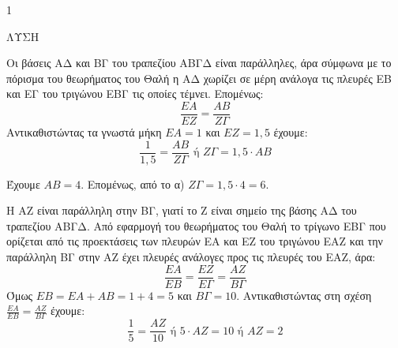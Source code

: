 \begin{ylh}{1}
    \item[Γεωμετρία Β' Λυκείου, Θεώρημα Θαλή]
\end{ylh}
ΛΥΣΗ

\begin{alist}
    \item Οι βάσεις ΑΔ και ΒΓ του τραπεζίου ΑΒΓΔ είναι παράλληλες, άρα σύμφωνα με το πόρισμα του θεωρήματος του Θαλή η ΑΔ χωρίζει σε μέρη ανάλογα τις πλευρές ΕΒ και ΕΓ του τριγώνου ΕΒΓ τις οποίες τέμνει. Επομένως:
    \[
        \frac{ΕΑ}{ΕΖ} = \frac{ΑΒ}{ΖΓ}
    \]
    Αντικαθιστώντας τα γνωστά μήκη $ΕΑ = 1$ και $ΕΖ = 1,5$ έχουμε:
    \[
        \frac{1}{1,5} = \frac{ΑΒ}{ΖΓ} \text{ ή } ΖΓ = 1,5 \cdot ΑΒ
    \]

    \item Έχουμε $ΑΒ = 4$. Επομένως, από το α) $ΖΓ = 1,5 \cdot 4 = 6$.

    \item Η ΑΖ είναι παράλληλη στην ΒΓ, γιατί το Ζ είναι σημείο της βάσης ΑΔ του τραπεζίου ΑΒΓΔ. Από εφαρμογή του θεωρήματος του Θαλή το τρίγωνο ΕΒΓ που ορίζεται από τις προεκτάσεις των πλευρών ΕΑ και ΕΖ του τριγώνου ΕΑΖ και την παράλληλη ΒΓ στην ΑΖ έχει πλευρές ανάλογες προς τις πλευρές του ΕΑΖ, άρα:
    \[
        \frac{ΕΑ}{ΕΒ} = \frac{ΕΖ}{ΕΓ} = \frac{ΑΖ}{ΒΓ}
    \]
    Όμως $ΕΒ = ΕΑ + ΑΒ = 1 + 4 = 5$ και $ΒΓ = 10$. Αντικαθιστώντας στη σχέση $\frac{ΕΑ}{ΕΒ} = \frac{ΑΖ}{ΒΓ}$ έχουμε:
    \[
        \frac{1}{5} = \frac{ΑΖ}{10} \text{ ή } 5 \cdot ΑΖ = 10 \text{ ή } ΑΖ = 2
    \]
\end{alist}